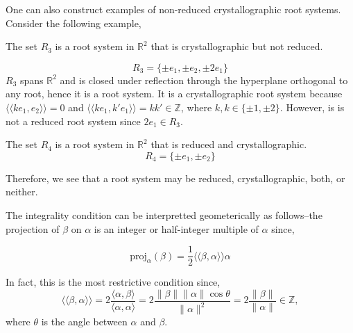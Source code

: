One can also construct examples of non-reduced crystallographic root systems. Consider the following example,

\begin{example}
    The set $R_3$ is a root system in $\mathbb{R}^2$ that is crystallographic but not reduced.
    
    \begin{equation*}
        R_3 = \{
            \pm e_1, \pm e_2, \pm 2 e_1
        \} 
    \end{equation*}
    $R_3$ spans $\mathbb{R}^2$ and is closed under reflection through the hyperplane orthogonal to any root,
    hence it is a root system.
    It is a crystallographic root system because
    $\langle \langle k e_1, e_2 \rangle \rangle = 0$ and $\langle \langle k e_1, k' e_1 \rangle \rangle = kk' \in \mathbb{Z}$,
    where $k,k \in \{\pm 1, \pm 2\}$.
    However, is is not a reduced root system since $2 e_1 \in R_3$.
\end{example}


\begin{example}
    The set $R_4$ is a root system in $\mathbb{R}^2$ that is reduced and crystallographic.
    \begin{equation*}
        R_4 = \{
            \pm e_1, \pm e_2
            \} 
    \end{equation*}
\end{example}

Therefore, we see that a root system may be reduced, crystallographic, both, or neither. \newline


The integrality condition can be interpretted geometerically as follows--the projection of $\beta$ on $\alpha$ is
an integer or half-integer multiple of $\alpha$ since,

\begin{equation*}
    \text{proj}_{\alpha}(\beta) = \frac{1}{2} \langle \langle \beta, \alpha \rangle \rangle \alpha
\end{equation*}

In fact, this is the most restrictive condition since,
\begin{equation*}
    \langle \langle \beta, \alpha \rangle \rangle 
    =  2 \frac{ \langle \alpha, \beta \rangle}{\langle \alpha, \alpha \rangle}
    = 2 \frac{\|\beta\| \|\alpha\| \cos\theta }{\|\alpha\|^2}
    = 2 \frac{\|\beta\|}{\|\alpha\|} \in \mathbb{Z},
\end{equation*}
where $\theta$ is the angle between $\alpha$ and $\beta$.

